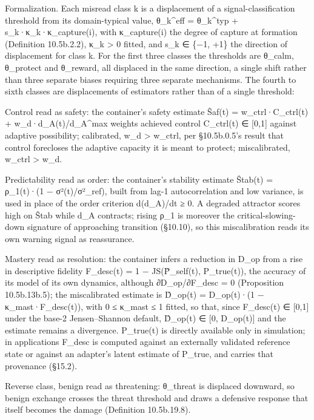 \documentclass[
]{article}
\begin{document}
Formalization. Each misread class k is a displacement of a
signal-classification threshold from its domain-typical value,
θ\_k\^{}eff = θ\_k\^{}typ + s\_k·κ\_k·κ\_capture(i), with κ\_capture(i)
the degree of capture at formation (Definition 10.5b.2.2), κ\_k
\textgreater{} 0 fitted, and s\_k ∈ \{−1, +1\} the direction of
displacement for class k. For the first three classes the thresholds are
θ\_calm, θ\_protect and θ\_reward, all displaced in the same direction,
a single shift rather than three separate biases requiring three
separate mechanisms. The fourth to sixth classes are displacements of
estimators rather than of a single threshold:

Control read as safety: the container's safety estimate Ŝaf(t) =
w\_ctrl·C\_ctrl(t) + w\_d·d\_A(t)/d\_A\^{}max weights achieved control
C\_ctrl(t) ∈ {[}0,1{]} against adaptive possibility; calibrated, w\_d
\textgreater{} w\_ctrl, per §10.5b.0.5's result that control forecloses
the adaptive capacity it is meant to protect; miscalibrated, w\_ctrl
\textgreater{} w\_d.

Predictability read as order: the container's stability estimate Ŝtab(t)
= ρ\_1(t)·(1 − σ²(t)/σ²\_ref), built from lag-1 autocorrelation and low
variance, is used in place of the order criterion d(d\_A)/dt ≥ 0. A
degraded attractor scores high on Ŝtab while d\_A contracts; rising ρ\_1
is moreover the critical-slowing-down signature of approaching
transition (§10.10), so this miscalibration reads its own warning signal
as reassurance.

Mastery read as resolution: the container infers a reduction in D\_op
from a rise in descriptive fidelity F\_desc(t) = 1 − JS(P̂\_self(t),
P\_true(t)), the accuracy of its model of its own dynamics, although
∂D\_op/∂F\_desc = 0 (Proposition 10.5b.13b.5); the miscalibrated
estimate is D̂\_op(t) = D\_op(t)·(1 − κ\_mast·F\_desc(t)), with 0 ≤
κ\_mast ≤ 1 fitted, so that, since F\_desc(t) ∈ {[}0,1{]} under the
base-2 Jensen--Shannon default, D̂\_op(t) ∈ {[}0, D\_op(t){]} and the
estimate remains a divergence. P\_true(t) is directly available only in
simulation; in applications F\_desc is computed against an externally
validated reference state or against an adapter's latent estimate of
P\_true, and carries that provenance (§15.2).

Reverse class, benign read as threatening: θ\_threat is displaced
downward, so benign exchange crosses the threat threshold and draws a
defensive response that itself becomes the damage (Definition
10.5b.19.8).
\end{document}
